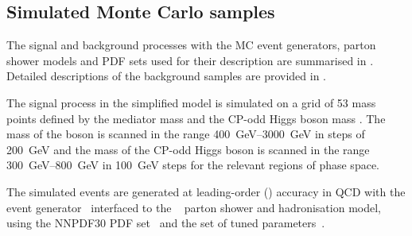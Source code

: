 \subsection{Simulated Monte Carlo samples}
\label{sec:monoH:physics:mcsamples}
The signal and background processes with the MC event generators, parton shower models and PDF sets used for their description are summarised in . Detailed descriptions of the background samples are provided in .

The signal process in the \zhdm simplified model is simulated on a grid of \num{53} mass points defined by the mediator mass \mZp and the CP-odd Higgs boson mass \mA.
The mass of the \PZprime boson is scanned in the range \SIrange{400}{3000}{\giga\electronvolt} in steps of \SI{200}{\giga\electronvolt} and the mass of the CP-odd Higgs boson \PA is scanned in the range \SIrange{300}{800}{\giga\electronvolt} in \SI{100}{\giga\electronvolt} steps for the relevant regions of phase space.

The simulated events are generated at leading-order (\LO) accuracy in QCD with the  event generator~\cite{Alwall:2014hca} interfaced to the ~\cite{Sjostrand:2014zea} parton shower and hadronisation model, using the \textsc{NNPDF30} PDF set~\cite{Ball2015} and the \AFourteen set of tuned parameters~\cite{ATL-PHYS-PUB-2014-021}.


